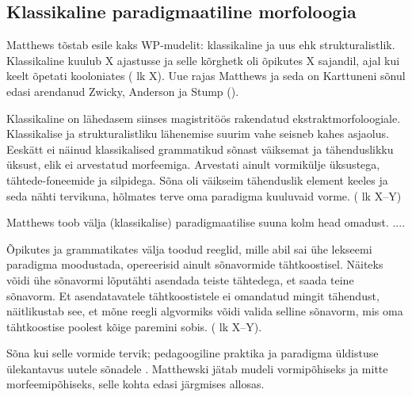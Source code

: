 \documentclass[12pt,a4paper]{article}
\begin{document}

\subsection{Klassikaline paradigmaatiline morfoloogia}

Matthews tõstab esile kaks WP-mudelit: klassikaline ja uus ehk strukturalistlik. Klassikaline kuulub X ajastusse ja selle kõrghetk oli õpikutes X sajandil, ajal kui keelt õpetati kooloniates (\cite{matthews_morphology_1991} lk X). Uue rajas Matthews ja seda on Karttuneni sõnul edasi arendanud Zwicky, Anderson ja Stump (\cite[2]{karttunen_computing_2003}).

Klassikaline on lähedasem siinses magistritöös rakendatud ekstraktmorfoloogiale. Klassikalise ja strukturalistliku lähenemise suurim vahe seisneb kahes asjaolus. Eeskätt ei näinud klassikalised grammatikud sõnast väiksemat ja tähenduslikku üksust, elik ei arvestatud morfeemiga. Arvestati ainult vormikülje üksustega, tähtede-foneemide ja silpidega. Sõna oli väikseim tähenduslik element keeles ja seda nähti tervikuna, hõlmates terve oma paradigma kuuluvaid vorme. (\cite{matthews_morphology_1991} lk X--Y)

Matthews toob välja (klassikalise) paradigmaatilise suuna kolm head omadust. ....

Õpikutes ja grammatikates välja toodud reeglid, mille abil sai ühe lekseemi paradigma moodustada, opereerisid ainult sõnavormide tähtkoostisel. Näiteks võidi ühe sõnavormi lõputähti asendada teiste tähtedega, et saada teine sõnavorm. Et asendatavatele tähtkoostistele ei omandatud mingit tähendust, näitlikustab see, et mõne reegli algvormiks võidi valida selline sõnavorm, mis oma tähtkoostise poolest kõige paremini sobis. (\cite{matthews_morphology_1991} lk X--Y).


Sõna kui selle vormide tervik; pedagoogiline praktika ja paradigma üldistuse ülekantavus uutele sõnadele \cite{matthews_morphology_1991}. Matthewski jätab mudeli vormipõhiseks ja mitte morfeemipõhiseks, selle kohta edasi järgmises allosas.
\end{document}
